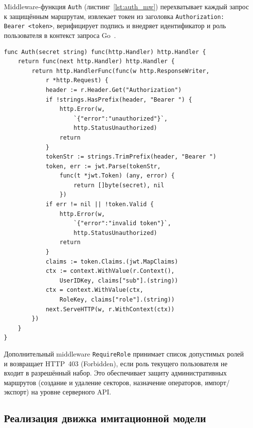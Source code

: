 Middleware-функция \texttt{Auth} (листинг~\ref{lst:auth_mw})
перехватывает каждый запрос к защищённым маршрутам, извлекает
токен из заголовка \texttt{Authorization: Bearer~<token>},
верифицирует подпись и внедряет идентификатор и роль
пользователя в контекст запроса Go~\cite{go_context_pkgdev}.

\begin{lstlisting}[caption={Middleware аутентификации (middleware/auth.go)}, label={lst:auth_mw}]
func Auth(secret string) func(http.Handler) http.Handler {
    return func(next http.Handler) http.Handler {
        return http.HandlerFunc(func(w http.ResponseWriter,
            r *http.Request) {
            header := r.Header.Get("Authorization")
            if !strings.HasPrefix(header, "Bearer ") {
                http.Error(w,
                    `{"error":"unauthorized"}`,
                    http.StatusUnauthorized)
                return
            }
            tokenStr := strings.TrimPrefix(header, "Bearer ")
            token, err := jwt.Parse(tokenStr,
                func(t *jwt.Token) (any, error) {
                    return []byte(secret), nil
                })
            if err != nil || !token.Valid {
                http.Error(w,
                    `{"error":"invalid token"}`,
                    http.StatusUnauthorized)
                return
            }
            claims := token.Claims.(jwt.MapClaims)
            ctx := context.WithValue(r.Context(),
                UserIDKey, claims["sub"].(string))
            ctx = context.WithValue(ctx,
                RoleKey, claims["role"].(string))
            next.ServeHTTP(w, r.WithContext(ctx))
        })
    }
}
\end{lstlisting}

Дополнительный middleware \texttt{RequireRole} принимает
список допустимых ролей и возвращает HTTP~403 (Forbidden),
если роль текущего пользователя не входит в разрешённый
набор. Это обеспечивает защиту административных маршрутов
(создание и удаление секторов, назначение операторов,
импорт/экспорт) на уровне серверного API.


\subsection{Реализация движка имитационной модели}

